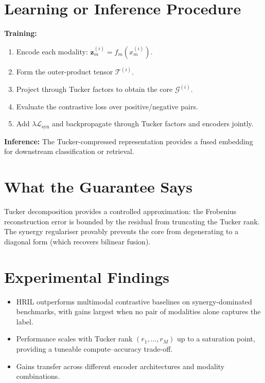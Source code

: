 \documentclass[10pt,twocolumn]{article}
\begin{document}
\section{Learning or Inference Procedure}

\textbf{Training:}
\begin{enumerate}[itemsep=2pt,parsep=0pt]
  \item Encode each modality: $\mathbf{z}_m^{(i)} = f_m(x_m^{(i)})$.
  \item Form the outer-product tensor $\mathcal{T}^{(i)}$.
  \item Project through Tucker factors to obtain the core $\mathcal{G}^{(i)}$.
  \item Evaluate the contrastive loss over positive/negative pairs.
  \item Add $\lambda\mathcal{L}_\text{syn}$ and backpropagate through
    Tucker factors and encoders jointly.
\end{enumerate}

\textbf{Inference:} The Tucker-compressed representation provides a
fused embedding for downstream classification or retrieval.

\section{What the Guarantee Says}

Tucker decomposition provides a controlled approximation: the Frobenius
reconstruction error is bounded by the residual from truncating the Tucker
rank. The synergy regulariser provably prevents the core from degenerating
to a diagonal form (which recovers bilinear fusion).

\section{Experimental Findings}

\begin{itemize}[itemsep=2pt,parsep=0pt]
  \item HRIL outperforms multimodal contrastive baselines on synergy-dominated
    benchmarks, with gains largest when no pair of modalities alone
    captures the label.
  \item Performance scales with Tucker rank $(r_1, \ldots, r_M)$ up to a
    saturation point, providing a tuneable compute--accuracy trade-off.
  \item Gains transfer across different encoder architectures
    and modality combinations.
\end{itemize}
\end{document}
